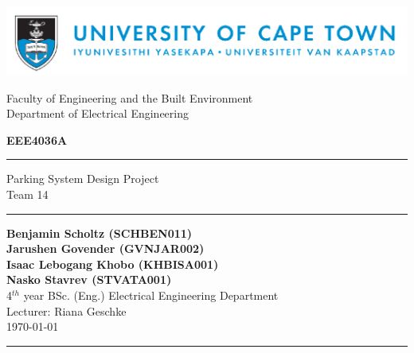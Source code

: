 \newcommand{\homedir}{/home/bscholtz/workspace/workspace-latex/2016-Design-Project/LATEX/}



\newcommand{\coursecode}{EEE4036A}
\newcommand{\assignment}{Parking System Design Project\\Team 14}
\newcommand{\lecturer}{Riana Geschke}

\pagestyle{fancy}
\fancyhf{}
\cfoot{\thepage}



\begin{titlepage} 
\includegraphics[width = 17cm]{images/uctbanner.png} \\

\begin{center}
\begin{LARGE}
Faculty of Engineering and the Built Environment \\
Department of Electrical Engineering \\
\end{LARGE}
\end{center}

\begin{center}  
\begin{Huge}
\textbf{\coursecode}\\
\bigskip
\bigskip
\hrule
\assignment \\
\end{Huge}

\vspace*{\fill}

\hrule
\begin{center}
\textbf{Benjamin Scholtz (SCHBEN011)\\
Jarushen Govender (GVNJAR002)\\
Isaac Lebogang Khobo (KHBISA001)\\
Nasko Stavrev (STVATA001)\\}
4$^{th}$ year BSc. (Eng.) Electrical Engineering Department\\
Lecturer: \lecturer \\
\today
\end{center}
\bigskip
\hrule

\end{center}
\end{titlepage}

